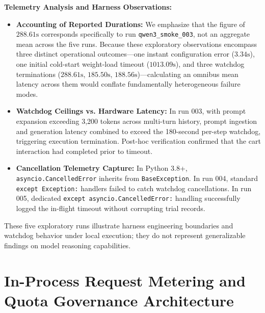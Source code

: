 \documentclass[11pt,a4paper]{article}
\begin{document}
\textbf{Telemetry Analysis and Harness Observations:}
\begin{itemize}
    \item \textbf{Accounting of Reported Durations:} We emphasize that the figure of $288.61\text{s}$ corresponds specifically to run \texttt{qwen3\_smoke\_003}, not an aggregate mean across the five runs. Because these exploratory observations encompass three distinct operational outcomes---one instant configuration error ($3.34\text{s}$), one initial cold-start weight-load timeout ($1013.09\text{s}$), and three watchdog terminations ($288.61\text{s}$, $185.50\text{s}$, $188.56\text{s}$)---calculating an omnibus mean latency across them would conflate fundamentally heterogeneous failure modes.
    \item \textbf{Watchdog Ceilings vs. Hardware Latency:} In run 003, with prompt expansion exceeding 3,200 tokens across multi-turn history, prompt ingestion and generation latency combined to exceed the 180-second per-step watchdog, triggering execution termination. Post-hoc verification confirmed that the cart interaction had completed prior to timeout.
    \item \textbf{Cancellation Telemetry Capture:} In Python 3.8+, \texttt{asyncio.CancelledError} inherits from \texttt{BaseException}. In run 004, standard \texttt{except Exception:} handlers failed to catch watchdog cancellations. In run 005, dedicated \texttt{except asyncio.CancelledError:} handling successfully logged the in-flight timeout without corrupting trial records.
\end{itemize}
These five exploratory runs illustrate harness engineering boundaries and watchdog behavior under local execution; they do not represent generalizable findings on model reasoning capabilities.

\clearpage
\section{In-Process Request Metering and Quota Governance Architecture}
\label{app:quota_governance}
\end{document}
